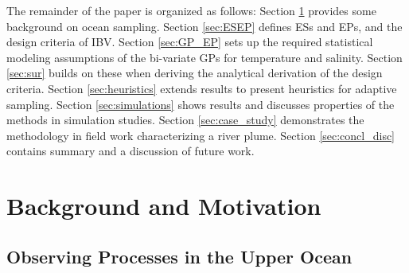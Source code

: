 \documentclass[aoas]{imsart}
\begin{document}
The remainder of the paper is organized as follows: Section
\ref{sec:bg} provides some background on ocean sampling. Section
\ref{sec:ESEP} defines ESs and EPs, and the design criteria of
IBV. Section \ref{sec:GP_EP} sets up the required statistical modeling
assumptions of the bi-variate GPs for temperature and
salinity. Section \ref{sec:sur} builds on these when deriving the
analytical derivation of the design criteria. Section
\ref{sec:heuristics} extends results to present heuristics for
adaptive sampling. Section \ref{sec:simulations} shows results and
discusses properties of the methods in simulation studies. Section
\ref{sec:case_study} demonstrates the methodology in field work
characterizing a river plume.  Section \ref{sec:concl_disc} contains
summary and a discussion of future work.


\section{Background and Motivation}\label{sec:bg}


\subsection{Observing Processes in the Upper Ocean}


\end{document}
